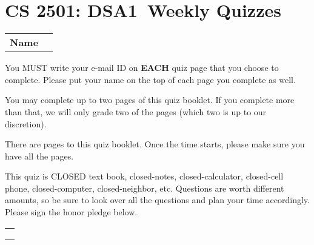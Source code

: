 \documentclass[10pt]{article}
\def\course{CS 2501: DSA1}
\def\exam{Weekly Quizzes}
\begin{document}
\section*{\course\ \exam}

\vspace{0.1in}

\begin{tabular}{ll}
\Large\bf\hspace{-0.125in} Name & \hspace*{5in} \\ \cline{2-2}
\end{tabular}

\vspace{0.35in}

\noindent You MUST write your e-mail ID on {\bf EACH} quiz page that you choose to complete. Please put your name on the top of each page you complete as well.

\vspace{12pt}

\noindent You may complete up to two pages of this quiz booklet. If you complete more than that, we will only grade two of the pages (which two is up to our discretion).

\vspace{12pt}

\noindent There are \pageref{LastPage} pages to this quiz booklet.  Once the
time starts, please make sure you have all the pages.

\vspace{12pt}

\noindent This quiz is CLOSED text book, closed-notes,
closed-calculator, closed-cell phone, closed-com\-pu\-ter,
closed-neighbor, etc.  Questions are worth different amounts, so be
sure to look over all the questions and plan your time accordingly.
Please sign the honor pledge below.

\vspace{0.25in}

\begin{center}
\noindent \begin{tabular}{c} \hline
\hspace*{6in}\vspace{0.25in}\\ \hline
\hspace*{6in}\vspace{0.25in}\\ \hline
\hspace*{6in}\vspace{0.25in}\\ \hline
\hspace*{6in}\vspace{0.25in}\\ \hline
\end{tabular}
\end{center}
\end{document}
